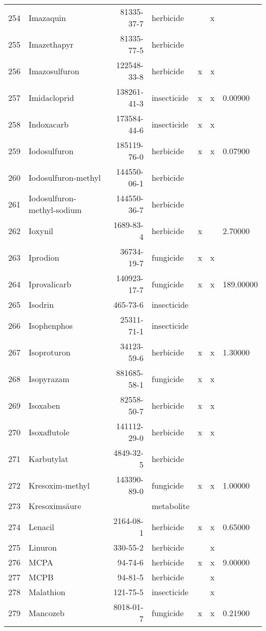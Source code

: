 \begin{longtable}{lp{4cm}rlp{1.3cm}p{1.3cm}p{1.5cm}}
  254 & Imazaquin & 81335-37-7 & herbicide &  & x &  \\ 
  255 & Imazethapyr & 81335-77-5 & herbicide &  &  &  \\ 
  256 & Imazosulfuron & 122548-33-8 & herbicide & x & x &  \\ 
  257 & Imidacloprid & 138261-41-3 & insecticide & x & x & 0.00900 \\ 
  258 & Indoxacarb & 173584-44-6 & insecticide & x & x &  \\ 
  259 & Iodosulfuron & 185119-76-0 & herbicide & x & x & 0.07900 \\ 
  260 & Iodosulfuron-methyl & 144550-06-1 & herbicide &  &  &  \\ 
  261 & Iodosulfuron-methyl-sodium & 144550-36-7 & herbicide &  &  &  \\ 
  262 & Ioxynil & 1689-83-4 & herbicide & x &  & 2.70000 \\ 
  263 & Iprodion & 36734-19-7 & fungicide & x & x &  \\ 
  264 & Iprovalicarb & 140923-17-7 & fungicide & x & x & 189.00000 \\ 
  265 & Isodrin & 465-73-6 & insecticide &  &  &  \\ 
  266 & Isophenphos & 25311-71-1 & insecticide &  &  &  \\ 
  267 & Isoproturon & 34123-59-6 & herbicide & x & x & 1.30000 \\ 
  268 & Isopyrazam & 881685-58-1 & fungicide & x & x &  \\ 
  269 & Isoxaben & 82558-50-7 & herbicide & x & x &  \\ 
  270 & Isoxaflutole & 141112-29-0 & herbicide & x & x &  \\ 
  271 & Karbutylat & 4849-32-5 & herbicide &  &  &  \\ 
  272 & Kresoxim-methyl & 143390-89-0 & fungicide & x & x & 1.00000 \\ 
  273 & Kresoximsäure &  & metabolite &  &  &  \\ 
  274 & Lenacil & 2164-08-1 & herbicide & x & x & 0.65000 \\ 
  275 & Linuron & 330-55-2 & herbicide &  & x &  \\ 
  276 & MCPA & 94-74-6 & herbicide & x & x & 9.00000 \\ 
  277 & MCPB & 94-81-5 & herbicide &  & x &  \\ 
  278 & Malathion & 121-75-5 & insecticide &  & x &  \\ 
  279 & Mancozeb & 8018-01-7 & fungicide & x & x & 0.21900 \\ 

\end{longtable}
